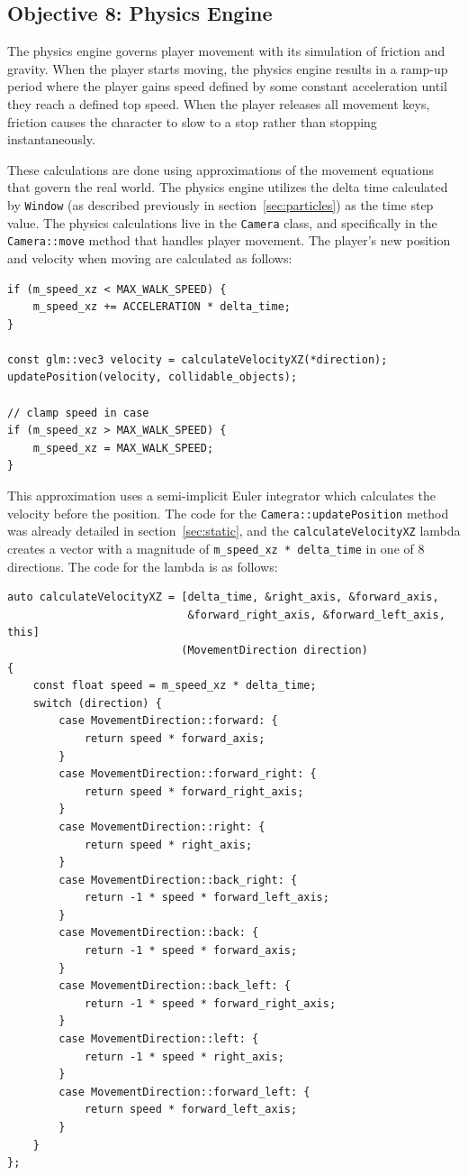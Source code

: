 \documentclass {article}
\begin{document}
\subsection{Objective 8: Physics Engine}
The physics engine governs player movement with its simulation of friction and gravity. When the player starts moving, the physics engine results in a ramp-up period where the player gains speed defined by some constant acceleration until they reach a defined top speed. When the player releases all movement keys, friction causes the character to slow to a stop rather than stopping instantaneously.

These calculations are done using approximations of the movement equations that govern the real world. The physics engine utilizes the delta time calculated by \texttt{Window} (as described previously in section~\ref{sec:particles}) as the time step value. The physics calculations live in the \texttt{Camera} class, and specifically in the \texttt{Camera::move} method that handles player movement. The player's new position and velocity when moving are calculated as follows:
\begin{verbatim}
if (m_speed_xz < MAX_WALK_SPEED) {
    m_speed_xz += ACCELERATION * delta_time;
}

const glm::vec3 velocity = calculateVelocityXZ(*direction);
updatePosition(velocity, collidable_objects);

// clamp speed in case
if (m_speed_xz > MAX_WALK_SPEED) {
    m_speed_xz = MAX_WALK_SPEED;
}
\end{verbatim}

This approximation uses a semi-implicit Euler integrator which calculates the velocity before the position. The code for the \texttt{Camera::updatePosition} method was already detailed in section~\ref{sec:static}, and the \texttt{calculateVelocityXZ} lambda creates a vector with a magnitude of \texttt{m\_speed\_xz * delta\_time} in one of 8 directions. The code for the lambda is as follows:
\begin{verbatim}
auto calculateVelocityXZ = [delta_time, &right_axis, &forward_axis,
                            &forward_right_axis, &forward_left_axis, this]
                           (MovementDirection direction)
{
    const float speed = m_speed_xz * delta_time;
    switch (direction) {
        case MovementDirection::forward: {
            return speed * forward_axis;
        }
        case MovementDirection::forward_right: {
            return speed * forward_right_axis;
        }
        case MovementDirection::right: {
            return speed * right_axis;
        }
        case MovementDirection::back_right: {
            return -1 * speed * forward_left_axis;
        }
        case MovementDirection::back: {
            return -1 * speed * forward_axis;
        }
        case MovementDirection::back_left: {
            return -1 * speed * forward_right_axis;
        }
        case MovementDirection::left: {
            return -1 * speed * right_axis;
        }
        case MovementDirection::forward_left: {
            return speed * forward_left_axis;
        }
    }
};
\end{verbatim}
\end{document}
